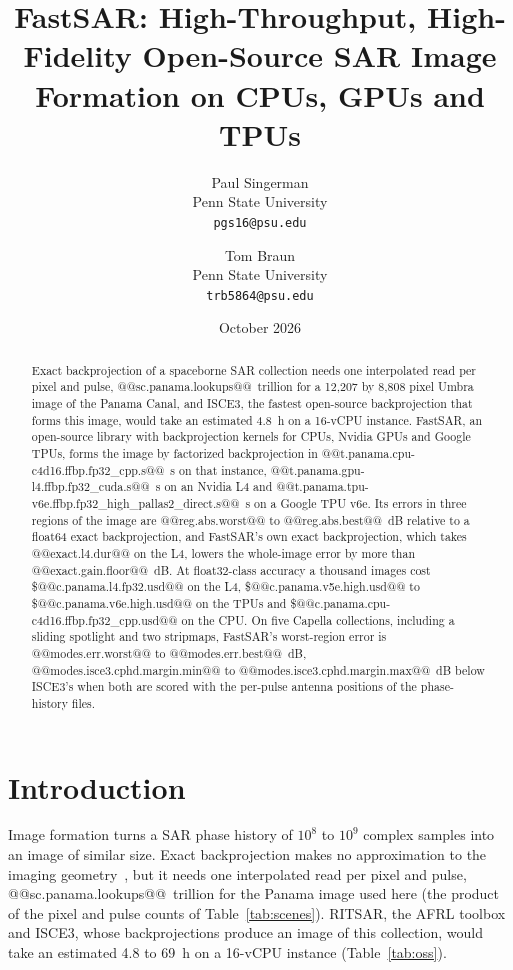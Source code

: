 \documentclass[11pt]{article}
\title{FastSAR: High-Throughput, High-Fidelity Open-Source SAR Image Formation on CPUs, GPUs and TPUs}
\author{Paul Singerman\\ Penn State University\\ \texttt{pgs16@psu.edu} \and Tom Braun\\ Penn State University\\ \texttt{trb5864@psu.edu}}
\date{October 2026}
\begin{document}
\maketitle

\begin{abstract}
Exact backprojection of a spaceborne SAR collection needs one interpolated read per pixel and pulse, @@sc.panama.lookups@@~trillion for a 12{,}207 by 8{,}808 pixel Umbra image of the Panama Canal, and ISCE3, the fastest open-source backprojection that forms this image, would take an estimated 4.8~h on a 16-vCPU instance. FastSAR, an open-source library with backprojection kernels for CPUs, Nvidia GPUs and Google TPUs, forms the image by factorized backprojection in @@t.panama.cpu-c4d16.ffbp.fp32_cpp.s@@~s on that instance, @@t.panama.gpu-l4.ffbp.fp32_cuda.s@@~s on an Nvidia L4 and @@t.panama.tpu-v6e.ffbp.fp32_high_pallas2_direct.s@@~s on a Google TPU v6e. Its errors in three regions of the image are @@reg.abs.worst@@ to @@reg.abs.best@@~dB relative to a float64 exact backprojection, and FastSAR's own exact backprojection, which takes @@exact.l4.dur@@ on the L4, lowers the whole-image error by more than @@exact.gain.floor@@~dB. At float32-class accuracy a thousand images cost \$@@c.panama.l4.fp32.usd@@ on the L4, \$@@c.panama.v5e.high.usd@@ to \$@@c.panama.v6e.high.usd@@ on the TPUs and \$@@c.panama.cpu-c4d16.ffbp.fp32_cpp.usd@@ on the CPU. On five Capella collections, including a sliding spotlight and two stripmaps, FastSAR's worst-region error is @@modes.err.worst@@ to @@modes.err.best@@~dB, @@modes.isce3.cphd.margin.min@@ to @@modes.isce3.cphd.margin.max@@~dB below ISCE3's when both are scored with the per-pulse antenna positions of the phase-history files.
\end{abstract}

\section{Introduction}

Image formation turns a SAR phase history of $10^8$ to $10^9$ complex samples into an image of similar size. Exact backprojection makes no approximation to the imaging geometry~\cite{jakowatz1996,gorham2010}, but it needs one interpolated read per pixel and pulse, @@sc.panama.lookups@@~trillion for the Panama image used here (the product of the pixel and pulse counts of Table~\ref{tab:scenes}). RITSAR, the AFRL toolbox and ISCE3, whose backprojections produce an image of this collection, would take an estimated 4.8 to 69~h on a 16-vCPU instance (Table~\ref{tab:oss}).
\end{document}
